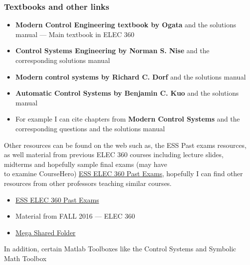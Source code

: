 \documentclass{beamer}
\begin{document}
\begin{frame}[allowframebreaks]
\frametitle{Textbooks and other links}
\begin{itemize}
	\item \textbf{Modern Control Engineering textbook by Ogata} \cite{textbook:ogata} and the solutions manual \cite{textbook:ogataSolution} --- Main textbook in ELEC 360
	\item \textbf{Control Systems Engineering by Norman S. Nise} \cite{textbook:nise} and the corresponding solutions manual \cite{textbook:niseSolution}
	\item \textbf{Modern control systems by Richard C. Dorf} \cite{textbook:dorf} and the solutions manual \cite{textbook:dorfSolution}
	\item \textbf{Automatic Control Systems by Benjamin C. Kuo} \cite{textbook:kuo} and the solutions manual \cite{textbook:kuoSolutions}
	\item For example I can cite chapters from \textbf{Modern Control Systems} and the corresponding questions \cite[Chapter 1]{textbook:dorf} and the solutions manual \cite[Q. 1(a,b,c,d)]{textbook:dorfSolution}
\end{itemize}
Other resources can be found on the web such as, the ESS Past exams resources, as well material from previous ELEC 360 courses including lecture slides, midterms and hopefully sample final exams (may have \\ 
to examine CourseHero) \href{http://ess.uvic.ca/exams/ELEC/Elec\%20360/}{ESS ELEC 360 Past Exams}, hopefully I can find other resources from other professors teaching similar courses.

\begin{itemize}
	\item   \href{http://ess.uvic.ca/exams/ELEC/Elec\%20360/}{ESS ELEC 360 Past Exams} \cite{essElec360:Online}
	\item 	Material from FALL 2016 --- ELEC 360
	\item   \href{https://mega.nz/\#F!eJN1XLoI!cLb7ZYON1q53OeUFHShrJg\!XcllnAhA}{Mega Shared Folder} \cite{megaElec360:Online} 
\end{itemize}
In addition, certain Matlab Toolboxes like the Control Systems \cite{MatlabCST} and Symbolic Math Toolbox \cite{MatlabSMT}
\end{frame}
\end{document}

